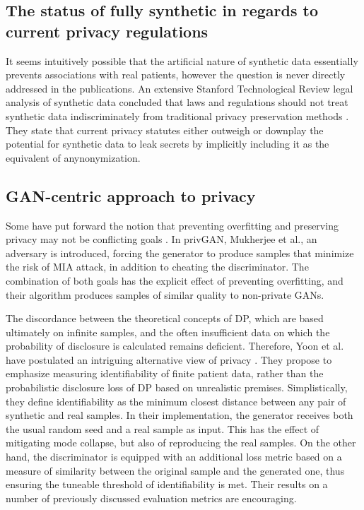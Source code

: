 \subsection{The status of fully synthetic in regards to current privacy regulations}
It seems intuitively possible that the artificial nature of synthetic data essentially prevents associations with real patients, however the question is never directly addressed in the publications. An extensive Stanford Technological Review legal analysis of synthetic data concluded that laws and regulations should not treat synthetic data indiscriminately from traditional privacy preservation methods \cite{bellovin2019privacy}. They state that current privacy statutes either outweigh or downplay the potential for synthetic data to leak secrets by implicitly including it as the equivalent of anynonymization. 
\subsection{GAN-centric approach to privacy}
Some have put forward the notion that preventing overfitting and preserving privacy may not be conflicting goals \cite{Wu2019-ui,Mukherjee2019-vu}. In privGAN, Mukherjee et al., an adversary is introduced, forcing the generator to produce samples that minimize the risk of MIA attack, in addition to cheating the discriminator. The combination of both goals has the explicit effect of preventing overfitting, and their algorithm produces samples of similar quality to non-private GANs.\par
The discordance between the theoretical concepts of DP, which are  based ultimately on infinite samples, and the often insufficient data on which the probability of disclosure is calculated remains deficient. Therefore, Yoon et al. have postulated an intriguing alternative view of privacy \cite{Yoon2020}. They propose to emphasize measuring identifiability of finite patient data, rather than the probabilistic disclosure loss of DP based on unrealistic premises. Simplistically, they define identifiability as the minimum closest distance between any pair of synthetic and real samples. In their implementation, the generator receives both the usual random seed and a real sample as input. This has the effect of mitigating mode collapse, but also of reproducing the real samples. On the other hand, the discriminator is equipped with an additional loss metric based on a measure of similarity between the original sample and the generated one, thus ensuring the tuneable threshold of identifiability is met. Their results on a number of previously discussed evaluation metrics are encouraging.\par
